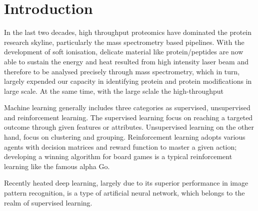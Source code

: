 \section{Introduction}

In the last two decades, high throughput proteomics have dominated the protein research skyline, particularly the mass spectrometry based pipelines. With the development of soft ionisation, delicate material like protein/peptides are now able to sustain the energy and heat resulted from high intensity laser beam and therefore to be analysed precisely through mass spectrometry, which in turn, largely expended our capacity in identifying protein and protein modifications in large scale. At the same time, with the large sclale  the high-throughput   
\par 
Machine learning generally includes three categories as supervised, unsupervised and reinforcement learning. The supervised learning focus on reaching a targeted outcome through given features or attributes. Unsupervised learning on the other hand, focus on clustering and grouping. Reinforcement learning adopts various agents with decision matrices and reward function to master a given action; developing a winning algorithm for board games is a typical reinforcement learning like the famous alpha Go.
\par
Recently heated deep learning, largely due to its superior performance in image pattern recognition, is a type of artificial neural network, which belongs to the realm of supervised learning. 
